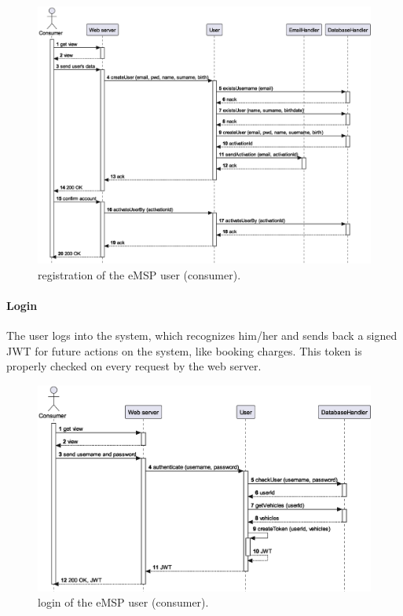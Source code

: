\begin{figure}[h!]
    \centering
    \includegraphics[width=\columnwidth]{./images/sequences/emsp/registration}
    \caption{registration of the eMSP user (consumer).}
\end{figure}

\pagebreak

\paragraph{Login} The user logs into the system, which recognizes him/her and sends back a signed JWT for future actions on the system, like booking charges. This token is properly checked on every request by the web server.

\begin{figure}[h!]
    \centering
    \includegraphics[width=\columnwidth]{./images/sequences/emsp/login}
    \caption{login of the eMSP user (consumer).}
\end{figure}

